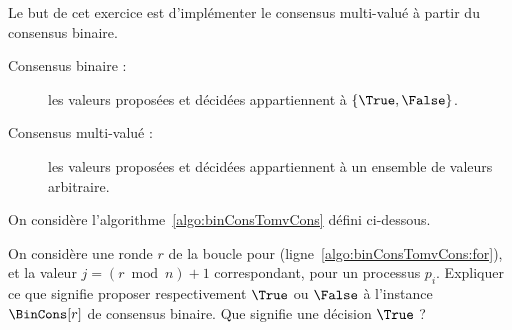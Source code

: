 
\begingroup

 
\begin{exercice}
 
  Le but de cet exercice est d'implémenter le consensus multi-valué à partir du consensus binaire. 
  \begin{description}
  \item[Consensus binaire :] les valeurs proposées et décidées appartiennent à $\{\True,\False\}$.
  \item[Consensus multi-valué :] les valeurs proposées et décidées appartiennent à un ensemble de valeurs arbitraire.
  \end{description}
  
  On considère l'algorithme~\ref{algo:binConsTomvCons} défini ci-dessous.
  
  \begin{algorithm}
    \nl {}
    \caption{Du consensus binaire au consensus multi-valué}
    \label{algo:binConsTomvCons}
  \end{algorithm}


  \begin{questions}

  \item On considère une ronde $r$ de la boucle pour (ligne~\ref{algo:binConsTomvCons:for}),
    et la valeur $j=(r\bmod n)+1$ correspondant, pour un processus $p_i$.
    Expliquer ce que signifie proposer respectivement $\True$ ou $\False$ à l'instance $\BinCons[r]$
    de consensus binaire. Que signifie une décision $\True$ ?


\end{questions}
\end{exercice}
